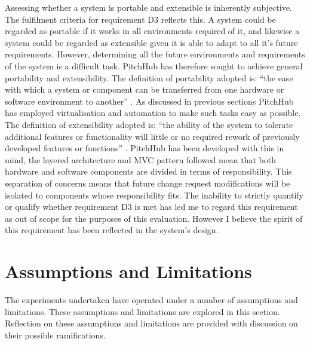 Assessing whether a system is portable and extensible is inherently subjective. The fulfilment criteria for requirement D3 reflects this. A system could be regarded as portable if it works in all environments required of it, and likewise a system could be regarded as extensible given it is able to adapt to all it's future requirements. However, determining all the future environments and requirements of the system is a difficult task. PitchHub has therefore sought to achieve general portability and extensibility. The definition of portability adopted is: ``the ease with which a system or component can be transferred from one hardware or software environment to another'' \cite{mattsson2006software}. As discussed in previous sections PitchHub has employed virtualisation and automation to make such tasks easy as possible. The definition of extensibility adopted is: ``the ability of the system to tolerate additional features or functionality will little or no required rework of previously developed features or functions'' \cite{Extensibility:online}. PitchHub has been developed with this in mind, the layered architecture and MVC pattern followed mean that both hardware and software components are divided in terms of responsibility. This separation of concerns means that future change request modifications will be isolated to components whose responsibility fits. The inability to strictly quantify or qualify whether requirement D3 is met has led me to regard this requirement as out of scope for the purposes of this evaluation. However I believe the spirit of this requirement has been reflected in the system's design.

\section{Assumptions and Limitations}
The experiments undertaken have operated under a number of assumptions and limitations. These assumptions and limitations are explored in this section. Reflection on these assumptions and limitations are provided with discussion on their possible ramifications.


